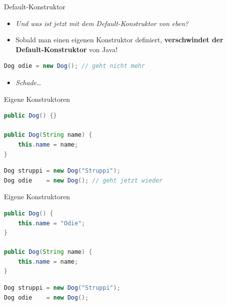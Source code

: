 \documentclass[18pt]{beamer}
\begin{document}
\begin{frame}[fragile]{Default-Konstruktor}
    \begin{itemize}
        \item \textit{Und was ist jetzt mit dem Default-Konstruktor von eben?}
        \item Sobald man einen eigenen Konstruktor definiert, \alert{\textbf{verschwindet der Default-Konstruktor}} von Java!
    \end{itemize}
    \begin{alertblock}{}
        \begin{lstlisting}[language=Java]
Dog odie = new Dog(); // geht nicht mehr
        \end{lstlisting}
    \end{alertblock}
    \vspace{.2in}
    \begin{itemize}
        \item \textit{Schade\dots}
    \end{itemize}
\end{frame}

\begin{frame}[fragile]{Eigene Konstruktoren}
    \begin{exampleblock}{}
        \begin{lstlisting}[language=Java]
public Dog() {}

public Dog(String name) {
    this.name = name;
}
        \end{lstlisting}
    \end{exampleblock}
    \begin{lstlisting}[language=Java]
Dog struppi = new Dog("Struppi");
Dog odie    = new Dog(); // geht jetzt wieder
    \end{lstlisting}
\end{frame}

\begin{frame}[fragile]{Eigene Konstruktoren}
    \begin{exampleblock}{}
        \begin{lstlisting}[language=Java]
public Dog() {
    this.name = "Odie";
}

public Dog(String name) {
    this.name = name;
}
        \end{lstlisting}
    \end{exampleblock}
    \begin{lstlisting}[language=Java]
Dog struppi = new Dog("Struppi");
Dog odie    = new Dog();
    \end{lstlisting}
\end{frame}
\end{document}
